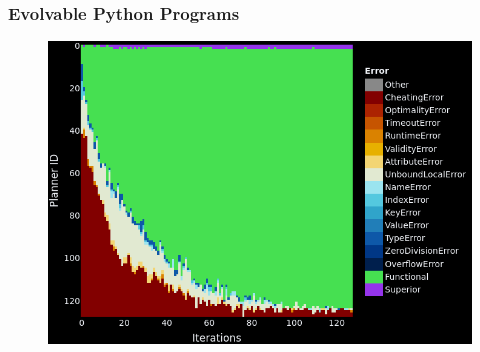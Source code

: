 \documentclass[aspectratio=169]{beamer}
\begin{document}
\begin{frame}[fragile]\frametitle{Evolvable Python Programs}
\vspace{-0.1cm}
\begin{figure}
    \centering
    \includegraphics[height=0.8\textheight, keepaspectratio]{figures/iterative_mutation.png}
\end{figure}
\end{frame}
\end{document}
